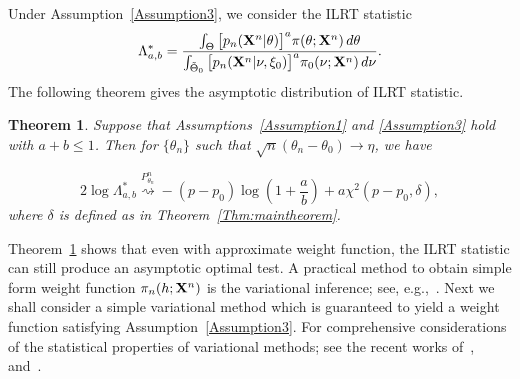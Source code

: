 \documentclass[11pt]{article}
\theoremstyle{plain}
\newtheorem{theorem}{\quad\quad Theorem}
\theoremstyle{definition}
\theoremstyle{remark}
\begin{document}
Under Assumption~\ref{Assumption3}, we consider the ILRT statistic
\begin{equation}
    \Lambda^*_{a,b}=\frac{\int_{\Theta} \big[p_n(\mathbf{X}^{n}|\theta)\big]^{a}\pi(\theta;\mathbf{X}^{n})\,d\theta}{\int_{\tilde{\Theta}_0} \big[p_n(\mathbf{X}^{n}|\nu,\xi_0)\big]^{a}\pi_0(\nu;\mathbf{X}^{n})\,d\nu}.
\label{eq:definition}
\end{equation}
The following theorem gives the asymptotic distribution of ILRT statistic.


\begin{theorem}\label{theoremMain}
    Suppose that Assumptions~\ref{Assumption1} and \ref{Assumption3} hold with $a+b\leq 1$.
    Then for $\{\theta_n\}$ such that $\sqrt{n}(\theta_n-\theta_0)\to \eta$, we have

        $$
        2\log \Lambda^*_{a,b}\overset{P^n_{\theta_n}}{\rightsquigarrow}-{(p-p_0)}\log (1+\frac{a}{b})+{a}\chi^2(p-p_0,\delta),
        $$
        where $\delta$ is defined as in Theorem~\ref{Thm:maintheorem}.
\end{theorem}
Theorem~\ref{theoremMain} shows that even with approximate weight function, the ILRT statistic can still produce an asymptotic optimal test.
A practical method to obtain simple form weight function $\pi_n(h;\mathbf{X}^{n})$ is the variational inference; see, e.g.,~\cite{blei2017}.
Next we shall consider a simple variational method which is guaranteed to yield a weight function satisfying Assumption~\ref{Assumption3}.
For comprehensive considerations of the statistical properties of variational methods; see the recent works of~\cite{yixin2017},~\cite{pati2017} and~\cite{yunyang2017}.

\end{document}
